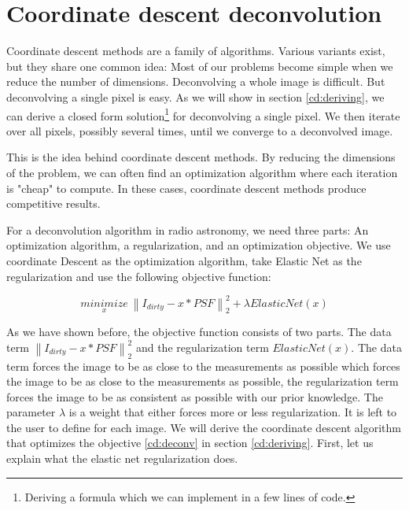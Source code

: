 \section{Coordinate descent deconvolution}\label{cd}
Coordinate descent methods are a family of algorithms. Various variants exist\cite{richtarik2016distributed, richtarik2016parallel}, but they share one common idea: Most of our problems become simple when we reduce the number of dimensions. Deconvolving a whole image is difficult. But deconvolving a single pixel is easy. As we will show in section \ref{cd:deriving}, we can derive a closed form solution\footnote{Deriving a formula which we can implement in a few lines of code.} for deconvolving a single pixel. We then iterate over all pixels, possibly several times, until we converge to a deconvolved image. 

This is the idea behind coordinate descent methods. By reducing the dimensions of the problem, we can often find an optimization algorithm where each iteration is "cheap" to compute. In these cases, coordinate descent methods produce competitive results\cite{nesterov2012efficiency, nesterov2013gradient}.

For a deconvolution algorithm in radio astronomy, we need three parts: An optimization algorithm, a regularization, and an optimization objective. We use coordinate Descent as the optimization algorithm, take Elastic Net as the regularization and use the following objective function:

\begin{equation}\label{cd:deconv}
\underset{x}{minimize} \: \left \| I_{dirty} - x * PSF \right \|_2^2 + \lambda ElasticNet(x)
\end{equation}

As we have shown before, the objective function consists of two parts. The data term $\left \| I_{dirty} - x * PSF \right \|_2^2$ and the regularization term $ElasticNet(x)$. The data term forces the image to be as close to the measurements as possible which forces the image to be as close to the measurements as possible, the regularization term forces the image to be as consistent as possible with our prior knowledge. The parameter $\lambda$ is a weight that either forces more or less regularization. It is left to the user to define for each image. We will derive the coordinate descent algorithm that optimizes the objective \eqref{cd:deconv} in section \ref{cd:deriving}. First, let us explain what the elastic net regularization does.

